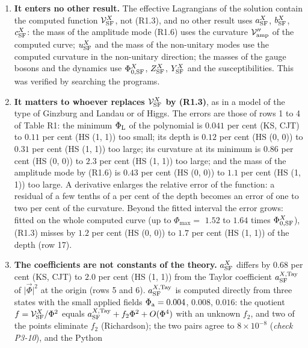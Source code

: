 \documentclass[
  10pt,
]{article}
\providecommand{\tightlist}{%
  \setlength{\itemsep}{0pt}\setlength{\parskip}{0pt}}
\begin{document}
\begin{enumerate}
\def\labelenumi{\arabic{enumi}.}
\tightlist
\item
  \textbf{It enters no other result.} The effective Lagrangians of the
  solution contain the computed function \(\mathcal V^X_{\rm SF}\), not
  (R1.3), and no other result uses \(a^X_{\rm SF}\), \(b^X_{\rm SF}\),
  \(c^X_{\rm SF}\): the mass of the amplitude mode (R1.6) uses the
  curvature \(\mathcal V''_{\rm amp}\) of the computed curve;
  \(u^X_{\rm SF}\) and the mass of the non-unitary modes use the
  computed curvature in the non-unitary direction; the masses of the
  gauge bosons and the dynamics use \(\Phi^X_{0,{\rm SF}}\),
  \(Z^X_{\rm SF}\), \(Y^X_{\rm SF}\) and the susceptibilities. This was
  verified by searching the programs.
\item
  \textbf{It matters to whoever replaces \(\mathcal V^X_{\rm SF}\) by
  (R1.3)}, as in a model of the type of Ginzburg and Landau or of Higgs.
  The errors are those of rows 1 to 4 of Table R1: the minimum
  \(\Phi_{\rm L}\) of the polynomial is \(0.041\) per cent (KS, CJT) to
  \(0.11\) per cent (HS (1, 1)) too small; its depth is \(0.12\) per
  cent (HS (0, 0)) to \(0.31\) per cent (HS (1, 1)) too large; its
  curvature at its minimum is \(0.86\) per cent (HS (0, 0)) to \(2.3\)
  per cent (HS (1, 1)) too large; and the mass of the amplitude mode by
  (R1.6) is \(0.43\) per cent (HS (0, 0)) to \(1.1\) per cent (HS (1,
  1)) too large. A derivative enlarges the relative error of the
  function: a residual of a few tenths of a per cent of the depth
  becomes an error of one to two per cent of the curvature. Beyond the
  fitted interval the error grows: fitted on the whole computed curve
  (up to \(\Phi_{\max}=\) \(1.52\) to \(1.64\) times
  \(\Phi^X_{0,{\rm SF}}\)), (R1.3) misses by \(1.2\) per cent (HS (0,
  0)) to \(1.7\) per cent (HS (1, 1)) of the depth (row 17).
\item
  \textbf{The coefficients are not constants of the theory.}
  \(a^X_{\rm SF}\) differs by \(0.68\) per cent (KS, CJT) to \(2.0\) per
  cent (HS (1, 1)) from the Taylor coefficient
  \(a^{X,{\rm Tay}}_{\rm SF}\) of \(\lvert\vec\Phi\rvert^2\) at the
  origin (rows 5 and 6). \(a^{X,{\rm Tay}}_{\rm SF}\) is computed
  directly from three states with the small applied fields
  \(\Phi_{\rm a}=0.004\), \(0.008\), \(0.016\): the quotient
  \(f=\mathcal V^X_{\rm SF}/\Phi^2\) equals
  \(a^{X,{\rm Tay}}_{\rm SF}+f_2\Phi^2+O(\Phi^4)\) with an unknown
  \(f_2\), and two of the points eliminate \(f_2\) (Richardson); the two
  pairs agree to \(8\times10^{-8}\) (\emph{check P3-10}), and the Python

\end{enumerate}
\end{document}
